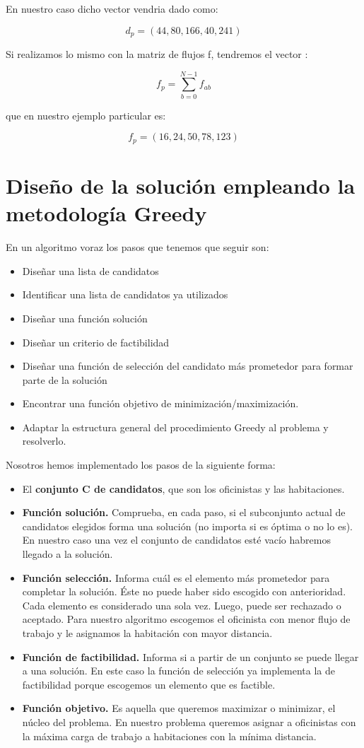 \documentclass[11pt, a4paper]{article}
\theoremstyle{theorem-style}
\theoremstyle{definition-style}
\theoremstyle{remark-style}
\theoremstyle{example-style}
\begin{document}
En nuestro caso dicho vector vendria dado como:

\[
d_{p}=(44,80,166,40,241)
\]

Si realizamos lo mismo con la matriz de flujos f, tendremos el vector
:

\[
f_{p}={\displaystyle \sum_{b=0}^{N-1}f_{ab}}
\]

que en nuestro ejemplo particular es:

\[
f_{p}=(16,24,50,78,123)
\]


\section{Diseño de la solución empleando la metodología Greedy}

En un algoritmo voraz los pasos que tenemos que seguir son: 
\begin{itemize}
\item Diseñar una lista de candidatos 
\item Identificar una lista de candidatos ya utilizados 
\item Diseñar una función solución 
\item Diseñar un criterio de factibilidad
\item Diseñar una función de selección del candidato más prometedor para
formar parte de la solución 
\item Encontrar una función objetivo de minimización/maximización. 
\item Adaptar la estructura general del procedimiento Greedy al problema y resolverlo.
\end{itemize}
Nosotros hemos implementado los pasos de la siguiente forma:
\begin{itemize}
\item El \textbf{conjunto C de candidatos}, que son los oficinistas y las habitaciones.
\item \textbf{Función solución.} Comprueba, en cada paso, si el subconjunto
actual de candidatos elegidos forma una solución (no importa si es
óptima o no lo es). En nuestro caso una vez el conjunto de candidatos
esté vacío habremos llegado a la solución. 
\item \textbf{Función selección.} Informa cuál es el elemento más prometedor
para completar la solución. Éste no puede haber sido escogido con
anterioridad. Cada elemento es considerado una sola vez. Luego, puede
ser rechazado o aceptado. Para nuestro algoritmo escogemos el oficinista
con menor flujo de trabajo y le asignamos la habitación con mayor
distancia.
\item \textbf{Función de factibilidad.} Informa si a partir de un conjunto
se puede llegar a una solución. En este caso la función de selección
ya implementa la de factibilidad porque escogemos un elemento que
es factible.
\item \textbf{Función objetivo.} Es aquella que queremos maximizar o minimizar,
el núcleo del problema. En nuestro problema queremos asignar a oficinistas
con la máxima carga de trabajo a habitaciones con la mínima distancia. 
\end{itemize}
\end{document}
